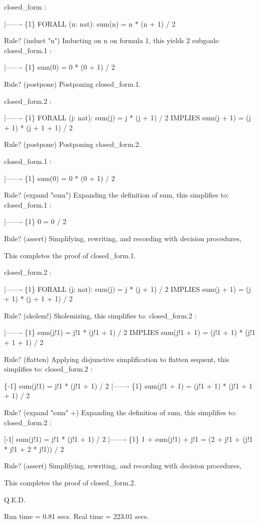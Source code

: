   closed_form :  

    |-------
  \{1\}   FORALL (n: nat): sum(n) = n * (n + 1) / 2

  Rule? (induct "n")
  Inducting on n on formula 1,
  this yields  2 subgoals: 
  closed_form.1 :  

    |-------
  \{1\}   sum(0) = 0 * (0 + 1) / 2

  Rule? (postpone)
  Postponing closed_form.1.

  closed_form.2 :  

    |-------
  \{1\}   FORALL (j: nat):
          sum(j) = j * (j + 1) / 2 IMPLIES sum(j + 1) = (j + 1) * (j + 1 + 1) / 2

  Rule? (postpone)
  Postponing closed_form.2.

  closed_form.1 :  

    |-------
  \{1\}   sum(0) = 0 * (0 + 1) / 2

  Rule? (expand "sum")
  Expanding the definition of sum,
  this simplifies to: 
  closed_form.1 :  

    |-------
  \{1\}   0 = 0 / 2

  Rule? (assert)
  Simplifying, rewriting, and recording with decision procedures,

  This completes the proof of closed_form.1.

  closed_form.2 :  

    |-------
  \{1\}   FORALL (j: nat):
          sum(j) = j * (j + 1) / 2 IMPLIES sum(j + 1) = (j + 1) * (j + 1 + 1) / 2

  Rule? (skolem!)
  Skolemizing,
  this simplifies to: 
  closed_form.2 :  

    |-------
  \{1\}   sum(j!1) = j!1 * (j!1 + 1) / 2 IMPLIES
         sum(j!1 + 1) = (j!1 + 1) * (j!1 + 1 + 1) / 2

  Rule? (flatten)
  Applying disjunctive simplification to flatten sequent,
  this simplifies to: 
  closed_form.2 :  

  \{-1\}  sum(j!1) = j!1 * (j!1 + 1) / 2
    |-------
  \{1\}   sum(j!1 + 1) = (j!1 + 1) * (j!1 + 1 + 1) / 2

  Rule? (expand "sum" +)
  Expanding the definition of sum,
  this simplifies to: 
  closed_form.2 :  

  [-1]  sum(j!1) = j!1 * (j!1 + 1) / 2
    |-------
  \{1\}   1 + sum(j!1) + j!1 = (2 + j!1 + (j!1 * j!1 + 2 * j!1)) / 2

  Rule? (assert)
  Simplifying, rewriting, and recording with decision procedures,

  This completes the proof of closed_form.2.

  Q.E.D.


  Run time  = 0.81 secs.
  Real time = 223.01 secs.
